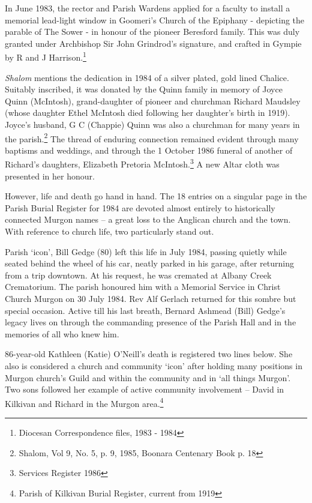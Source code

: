 In June 1983, the rector and Parish Wardens applied for a faculty to install a memorial lead-light window in Goomeri's Church of the Epiphany - depicting the parable of The Sower - in honour of the pioneer Beresford family. This was duly granted under Archbishop Sir John Grindrod's signature, and crafted in Gympie by R and J Harrison.\footnote{Diocesan Correspondence files, 1983 - 1984}


\emph{Shalom} mentions the dedication in 1984 of a silver plated, gold lined Chalice. Suitably inscribed, it was donated by the Quinn family in memory of Joyce Quinn (McIntosh), grand-daughter of pioneer and churchman Richard Maudsley (whose daughter Ethel McIntosh died following her daughter's birth in 1919). Joyce's husband, G C (Chappie) Quinn was also a churchman for many years in the parish.\footnote{Shalom, Vol 9, No. 5, p. 9, 1985, Boonara Centenary Book p. 18} The thread of enduring connection remained evident through many baptisms and weddings, and through the 1 October 1986 funeral of another of Richard's daughters, Elizabeth Pretoria McIntosh.\footnote{Services Register 1986} A new Altar cloth was presented in her honour.


However, life and death go hand in hand. The 18 entries on a singular page in the Parish Burial Register for 1984 are devoted almost entirely to historically connected Murgon names -- a great loss to the Anglican church and the town. With reference to church life, two particularly stand out.



Parish `icon', Bill Gedge (80) left this life in July 1984, passing quietly while seated behind the wheel of his car, neatly parked in his garage, after returning from a trip downtown. At his request, he was cremated at Albany Creek Crematorium. The parish honoured him with a Memorial Service in Christ Church Murgon on 30 July 1984. Rev Alf Gerlach returned for this sombre but special occasion. Active till his last breath, Bernard Ashmead (Bill) Gedge's legacy lives on through the commanding presence of the Parish Hall and in the memories of all who knew him.



86-year-old Kathleen (Katie) O'Neill's death is registered two lines below. She also is considered a church and community `icon' after holding many positions in Murgon church's Guild and within the community and in `all things Murgon'. Two sons followed her example of active community involvement -- David in Kilkivan and Richard in the Murgon area.\footnote{Parish of Kilkivan Burial Register, current from 1919}


